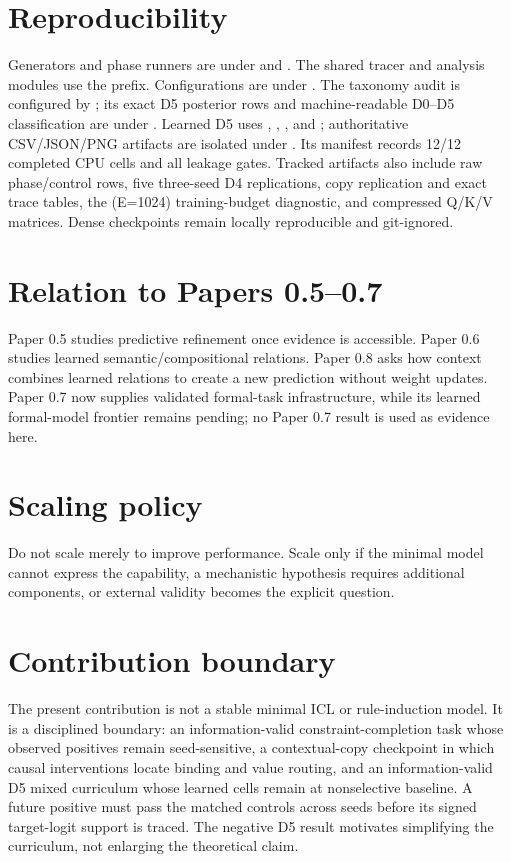 \documentclass[10pt]{article}
\begin{document}
\section{Reproducibility}
\begin{sloppypar}
Generators and phase runners are under  and . The shared tracer and analysis modules use the  prefix. Configurations are under . The taxonomy audit is configured by ; its exact D5 posterior rows and machine-readable D0--D5 classification are under . Learned D5 uses , , , and ; authoritative CSV/JSON/PNG artifacts are isolated under . Its manifest records 12/12 completed CPU cells and all leakage gates. Tracked artifacts also include raw phase/control rows, five three-seed D4 replications, copy replication and exact trace tables, the (E=1024) training-budget diagnostic, and compressed Q/K/V matrices. Dense checkpoints remain locally reproducible and git-ignored.
\end{sloppypar}

\section{Relation to Papers 0.5--0.7}
Paper 0.5 studies predictive refinement once evidence is accessible. Paper 0.6 studies learned semantic/compositional relations. Paper 0.8 asks how context combines learned relations to create a new prediction without weight updates. Paper 0.7 now supplies validated formal-task infrastructure, while its learned formal-model frontier remains pending; no Paper 0.7 result is used as evidence here.

\section{Scaling policy}
Do not scale merely to improve performance. Scale only if the minimal model cannot express the capability, a mechanistic hypothesis requires additional components, or external validity becomes the explicit question.

\section{Contribution boundary}
\enlargethispage{2\baselineskip}
The present contribution is not a stable minimal ICL or rule-induction model. It is a disciplined boundary: an information-valid constraint-completion task whose observed positives remain seed-sensitive, a contextual-copy checkpoint in which causal interventions locate binding and value routing, and an information-valid D5 mixed curriculum whose learned cells remain at nonselective baseline. A future positive must pass the matched controls across seeds before its signed target-logit support is traced. The negative D5 result motivates simplifying the curriculum, not enlarging the theoretical claim.
\end{document}
